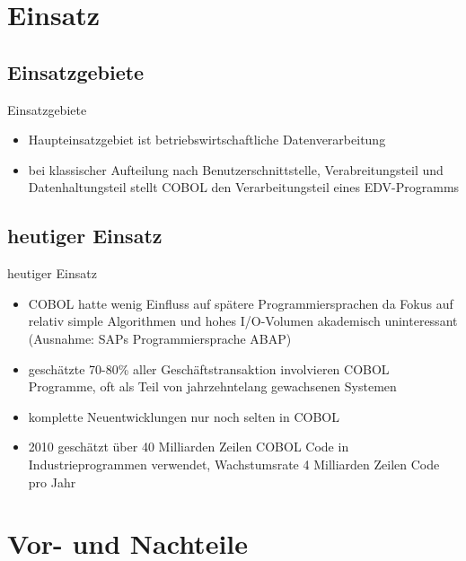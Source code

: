\documentclass{beamer}
\begin{document}
\section{Einsatz}
\subsection{Einsatzgebiete}
\begin{frame}{Einsatzgebiete}
	\begin{itemize}[<+->]
		\item
			Haupteinsatzgebiet ist betriebswirtschaftliche Datenverarbeitung
		\item
			bei klassischer Aufteilung nach Benutzerschnittstelle, Verabreitungsteil und Datenhaltungsteil stellt COBOL den Verarbeitungsteil eines EDV-Programms
	\end{itemize}
\end{frame}


\subsection{heutiger Einsatz}
\begin{frame}{heutiger Einsatz}
	\begin{itemize}[<+->]
		\item
			COBOL hatte wenig Einfluss auf sp\"atere Programmiersprachen da Fokus auf relativ simple Algorithmen und hohes I/O-Volumen akademisch uninteressant (Ausnahme: SAPs Programmiersprache ABAP)
		\item
			geschätzte 70-80\% aller Geschäftstransaktion involvieren COBOL Programme, oft als Teil von jahrzehntelang gewachsenen Systemen
		\item
			komplette Neuentwicklungen nur noch selten in COBOL
		\item
			2010 geschätzt \"uber 40 Milliarden Zeilen COBOL Code in Industrieprogrammen verwendet, Wachstumsrate 4 Milliarden Zeilen Code pro Jahr
	\end{itemize}
\end{frame}


\section{Vor- und Nachteile}
\end{document}
